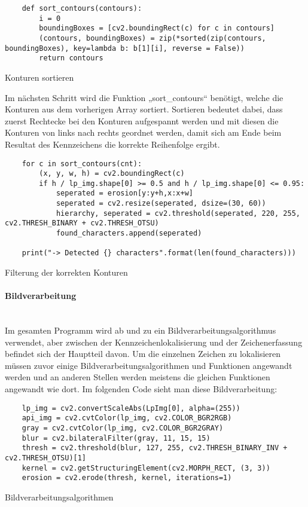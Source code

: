 \begin{listing}[H]
    \begin{verbatim}
    def sort_contours(contours):
        i = 0
        boundingBoxes = [cv2.boundingRect(c) for c in contours]
        (contours, boundingBoxes) = zip(*sorted(zip(contours, boundingBoxes), key=lambda b: b[1][i], reverse = False))
        return contours
    \end{verbatim}
    \caption{Konturen sortieren}
\end{listing}

Im nächsten Schritt wird die Funktion „sort{\_}contours“ benötigt, welche die Konturen aus dem vorherigen Array sortiert. Sortieren bedeutet dabei, 
dass zuerst Rechtecke bei den Konturen aufgespannt werden und mit diesen die Konturen von links nach rechts geordnet werden, damit sich am Ende beim Resultat 
des Kennzeichens die korrekte Reihenfolge ergibt.

\begin{listing}[H]
    \begin{verbatim}
    for c in sort_contours(cnt):
        (x, y, w, h) = cv2.boundingRect(c)
        if h / lp_img.shape[0] >= 0.5 and h / lp_img.shape[0] <= 0.95: 
            seperated = erosion[y:y+h,x:x+w]
            seperated = cv2.resize(seperated, dsize=(30, 60))
            hierarchy, seperated = cv2.threshold(seperated, 220, 255, cv2.THRESH_BINARY + cv2.THRESH_OTSU)
            found_characters.append(seperated)

    print("-> Detected {} characters".format(len(found_characters)))
    \end{verbatim}
    \caption{Filterung der korrekten Konturen}
\end{listing}

\paragraph{Bildverarbeitung}\mbox{}\\

Im gesamten Programm wird ab und zu ein Bildverarbeitungsalgorithmus verwendet, aber zwischen der Kennzeichenlokalisierung und der Zeichenerfassung befindet 
sich der Hauptteil davon. Um die einzelnen Zeichen zu lokalisieren müssen zuvor einige Bildverarbeitungsalgorithmen und Funktionen angewandt werden und 
an anderen Stellen werden meistens die gleichen Funktionen angewandt wie dort. Im folgenden Code sieht man diese Bildverarbeitung:

\begin{listing}[H]
    \begin{verbatim}
    lp_img = cv2.convertScaleAbs(LpImg[0], alpha=(255))
    api_img = cv2.cvtColor(lp_img, cv2.COLOR_BGR2RGB)
    gray = cv2.cvtColor(lp_img, cv2.COLOR_BGR2GRAY)
    blur = cv2.bilateralFilter(gray, 11, 15, 15)
    thresh = cv2.threshold(blur, 127, 255, cv2.THRESH_BINARY_INV + cv2.THRESH_OTSU)[1]
    kernel = cv2.getStructuringElement(cv2.MORPH_RECT, (3, 3))
    erosion = cv2.erode(thresh, kernel, iterations=1)
    \end{verbatim}
    \caption{Bildverarbeitungsalgorithmen}
\end{listing}

